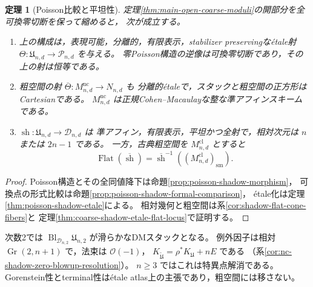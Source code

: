 \documentclass[a4paper,11pt]{ltjsarticle}
\numberwithin{equation}{section}
\theoremstyle{plain}
\newtheorem{theorem}{定理}[section]
\theoremstyle{definition}
\theoremstyle{remark}
\newcommand{\Gr}{\operatorname{Gr}}
\begin{document}
\begin{theorem}[Poisson比較と平坦性]\label{thm:main-poisson-shadow-comparison}
定理\ref{thm:main-open-coarse-moduli}の開部分を全可換零切断を保って縮めると，
次が成立する。
\begin{enumerate}
\item 上の構成は，表現可能，分離的，有限表示，stabilizer preservingな\'{e}tale射
 $\Theta:\mathfrak U_{n,d}\to\mathcal P_{n,d}$ を与える。
 零Poisson構造の逆像は可換零切断であり，その上の射は恒等である。
\item 粗空間の射 $\overline\Theta:M^{\mathrm{nc}}_{n,d}\to N_{n,d}$ も
 分離的\'{e}taleで，スタックと粗空間の正方形はCartesianである。
 $M^{\mathrm{nc}}_{n,d}$ は正規Cohen--Macaulayな整な準アフィンスキームである。
\item $\operatorname{sh}:\mathfrak U_{n,d}\to\mathcal D_{n,d}$ は
 準アフィン，有限表示，平坦かつ全射で，相対次元は $n$ または $2n-1$ である。
 一方，古典粗空間を $M^{\mathrm{cl}}_{n,d}$ とすると
 \[
  \operatorname{Flat}(\overline{\operatorname{sh}})
  =\overline{\operatorname{sh}}^{-1}((M^{\mathrm{cl}}_{n,d})_{\mathrm{sm}}).
 \]
\end{enumerate}
\end{theorem}
\begin{proof}
Poisson構造とその全同値降下は命題\ref{prop:poisson-shadow-morphism}，
可換点の形式比較は命題\ref{prop:poisson-shadow-formal-comparison}，
\'{e}tale化は定理\ref{thm:poisson-shadow-etale}による。
相対幾何と粗空間は系\ref{cor:shadow-flat-cone-fibers}と
定理\ref{thm:coarse-shadow-etale-flat-locus}で証明する。
\end{proof}

次数2では $\operatorname{Bl}_{\mathcal D_{n,2}}\mathfrak U_{n,2}$ が滑らかなDMスタックとなる。
例外因子は相対 $\Gr(2,n+1)$ で，法束は $\mathcal O(-1)$，
$K_{\widetilde{\mathfrak U}}=\rho^*K_{\mathfrak U}+nE$ である
（系\ref{cor:nc-shadow-zero-blowup-resolution}）。
$n\ge3$ ではこれは特異点解消である。
Gorenstein性とterminal性は\'{e}tale atlas上の主張であり，粗空間には移さない。
\end{document}

